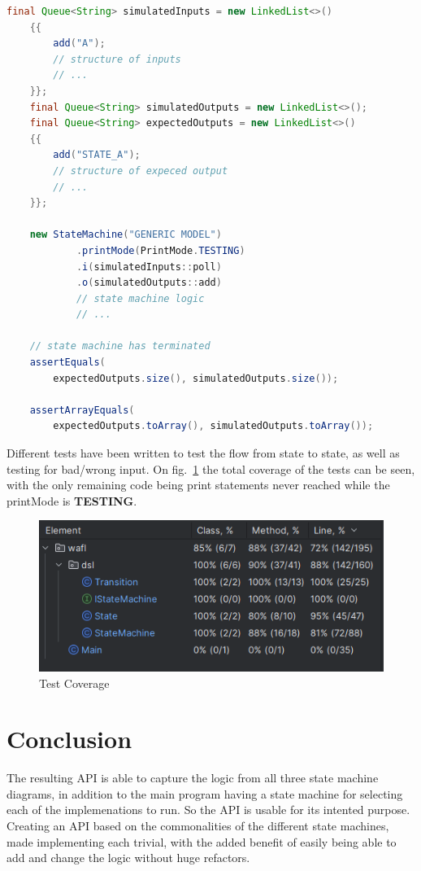 \documentclass{article}
\begin{document}
\begin{lstlisting}[language=java, caption={Input and Output Test Setup}, captionpos=b,]
    final Queue<String> simulatedInputs = new LinkedList<>()
    {{
        add("A");
        // structure of inputs
        // ...
    }};
    final Queue<String> simulatedOutputs = new LinkedList<>();
    final Queue<String> expectedOutputs = new LinkedList<>()
    {{
        add("STATE_A");
        // structure of expeced output
        // ...
    }};

    new StateMachine("GENERIC MODEL")
            .printMode(PrintMode.TESTING)
            .i(simulatedInputs::poll)
            .o(simulatedOutputs::add)
            // state machine logic
            // ...

    // state machine has terminated
    assertEquals(
        expectedOutputs.size(), simulatedOutputs.size());

    assertArrayEquals(
        expectedOutputs.toArray(), simulatedOutputs.toArray());       
\end{lstlisting}

Different tests have been written to test the flow from state to state, as well as testing for bad/wrong input. On fig.~\ref{fig:test_cov} the total coverage of the tests can be seen, with the only remaining code being print statements never reached while the printMode is \textbf{TESTING}.

\begin{figure}[H]
    \centering
    \includegraphics{figures/tests.PNG}
    \caption{Test Coverage}
    \label{fig:test_cov}
\end{figure}

\section{Conclusion}

The resulting API is able to capture the logic from all three state machine diagrams, in addition to the main program having a state machine for selecting each of the implemenations to run. So the API is usable for its intented purpose.\\
Creating an API based on the commonalities of the different state machines, made implementing each trivial, with the added benefit of easily being able to add and change the logic without huge refactors.
\end{document}
